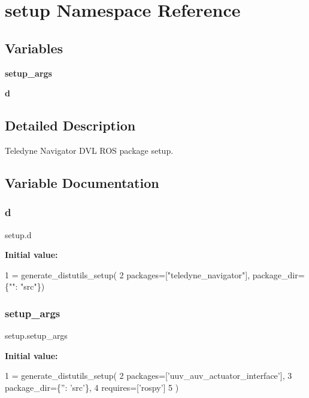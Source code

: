 \hypertarget{namespacesetup}{}\section{setup Namespace Reference}
\label{namespacesetup}
\subsection*{Variables}
\begin{DoxyCompactItemize}
\item 
{\bfseries setup\+\_\+args}
\item 
{\bfseries d}
\end{DoxyCompactItemize}


\subsection{Detailed Description}
\begin{DoxyVerb}Teledyne Navigator DVL ROS package setup.\end{DoxyVerb}
 

\subsection{Variable Documentation}
\mbox{\label{namespacesetup_aa2586b6c4dd84a0aaaf49cb1565cee6e}} 
\subsubsection{\texorpdfstring{d}{d}}
{\footnotesize\ttfamily setup.\+d}

{\bfseries Initial value\+:}
\begin{DoxyCode}
1 =  generate\_distutils\_setup(
2     packages=[\textcolor{stringliteral}{"teledyne\_navigator"}], package\_dir=\{\textcolor{stringliteral}{""}: \textcolor{stringliteral}{"src"}\})
\end{DoxyCode}
\mbox{\label{namespacesetup_a504ffa482edfe0eff08f64b2f5dff0e9}} 
\subsubsection{\texorpdfstring{setup\+\_\+args}{setup\_args}}
{\footnotesize\ttfamily setup.\+setup\+\_\+args}

{\bfseries Initial value\+:}
\begin{DoxyCode}
1 =  generate\_distutils\_setup(
2     packages=[\textcolor{stringliteral}{'uuv\_auv\_actuator\_interface'}],
3     package\_dir=\{\textcolor{stringliteral}{''}: \textcolor{stringliteral}{'src'}\},
4     requires=[\textcolor{stringliteral}{'rospy'}]
5 )
\end{DoxyCode}
